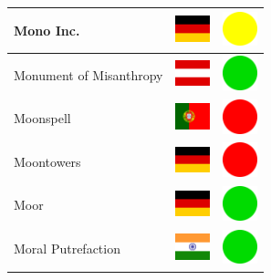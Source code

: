 \documentclass[12pt, a4paper, twoside]{report}
\begin{document}
\begin{center}
\begin{longtable}{|p{5cm}|p{2cm}|p{2cm}|}
 Mono Inc.                                                  & \includegraphics[width=1cm]{../img/flags/de} &   \includegraphics[width=1cm]{../likes/m} \\ \hline
 Monument of Misanthropy                                    & \includegraphics[width=1cm]{../img/flags/at} &   \includegraphics[width=1cm]{../likes/y} \\ \hline
 Moonspell                                                  & \includegraphics[width=1cm]{../img/flags/pt} &   \includegraphics[width=1cm]{../likes/n} \\ \hline
 Moontowers                                                 & \includegraphics[width=1cm]{../img/flags/de} &   \includegraphics[width=1cm]{../likes/n} \\ \hline
 Moor                                                       & \includegraphics[width=1cm]{../img/flags/de} &   \includegraphics[width=1cm]{../likes/y} \\ \hline
 Moral Putrefaction                                         & \includegraphics[width=1cm]{../img/flags/in} &   \includegraphics[width=1cm]{../likes/y} \\ \hline

\end{longtable}
\end{center}
\end{document}
